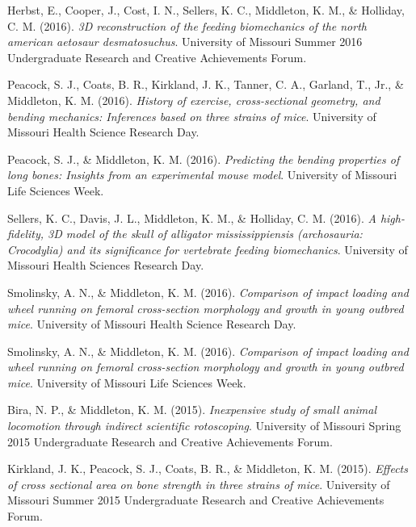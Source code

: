 \documentclass[11pt, a4paper]{awesome-cv}
\begin{document}
\leavevmode\hypertarget{ref-herbst_3d_2016}{}%
Herbst, E., Cooper, J., Cost, I. N., Sellers, K. C., Middleton, K. M.,
\& Holliday, C. M. (2016). \emph{3D reconstruction of the feeding
biomechanics of the north american aetosaur \textup{desmatosuchus}}.
University of Missouri Summer 2016 Undergraduate Research and Creative
Achievements Forum.

\leavevmode\hypertarget{ref-Peacock2016-cs}{}%
Peacock, S. J., Coats, B. R., Kirkland, J. K., Tanner, C. A., Garland,
T., Jr., \& Middleton, K. M. (2016). \emph{History of exercise,
cross-sectional geometry, and bending mechanics: Inferences based on
three strains of mice}. University of Missouri Health Science Research
Day.

\leavevmode\hypertarget{ref-peacock_predicting_2016}{}%
Peacock, S. J., \& Middleton, K. M. (2016). \emph{Predicting the bending
properties of long bones: Insights from an experimental mouse model}.
University of Missouri Life Sciences Week.

\leavevmode\hypertarget{ref-Sellers2016-vb}{}%
Sellers, K. C., Davis, J. L., Middleton, K. M., \& Holliday, C. M.
(2016). \emph{A high-fidelity, 3D model of the skull of
\textup{alligator mississippiensis} (archosauria: Crocodylia) and its
significance for vertebrate feeding biomechanics}. University of
Missouri Health Sciences Research Day.

\leavevmode\hypertarget{ref-Smolinsky2016-ox}{}%
Smolinsky, A. N., \& Middleton, K. M. (2016). \emph{Comparison of impact
loading and wheel running on femoral cross-section morphology and growth
in young outbred mice}. University of Missouri Health Science Research
Day.

\leavevmode\hypertarget{ref-smolinsky_comparison_2016a}{}%
Smolinsky, A. N., \& Middleton, K. M. (2016). \emph{Comparison of impact
loading and wheel running on femoral cross-section morphology and growth
in young outbred mice}. University of Missouri Life Sciences Week.

\leavevmode\hypertarget{ref-bira_inexpensive_2015}{}%
Bira, N. P., \& Middleton, K. M. (2015). \emph{Inexpensive study of
small animal locomotion through indirect scientific rotoscoping}.
University of Missouri Spring 2015 Undergraduate Research and Creative
Achievements Forum.

\leavevmode\hypertarget{ref-kirkland_effects_2015}{}%
Kirkland, J. K., Peacock, S. J., Coats, B. R., \& Middleton, K. M.
(2015). \emph{Effects of cross sectional area on bone strength in three
strains of mice}. University of Missouri Summer 2015 Undergraduate
Research and Creative Achievements Forum.
\end{document}

